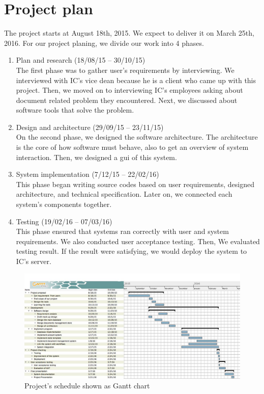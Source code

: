 \section{Project plan}
The project starts at August 18th, 2015.
We expect to deliver it on March 25th, 2016.
For our project planing, we divide our work into 4 phases.
\begin{enumerate}
\item Plan and research (18/08/15 -- 30/10/15) \hfill \\
The first phase was to gather user's requirements by interviewing.
We interviewed with IC's vice dean because he is a client who came up with this project.
Then, we moved on to interviewing IC's employees asking about document related problem they encountered.
Next, we discussed about software tools that solve the problem.
\item Design and architecture (29/09/15 -- 23/11/15) \hfill \\
On the second phase, we designed the software architecture.
The architecture is the core of how software must behave, also to get an overview of system interaction.
Then, we designed a \gls{gui} of this system.
\item System implementation (7/12/15 -- 22/02/16) \hfill \\
This phase began writing source codes based on user requirements, designed architecture, and technical specification.
Later on, we connected each system's components together.
\item Testing (19/02/16 -- 07/03/16) \hfill \\
This phase ensured that systems ran correctly with user and system requirements.
We also conducted user acceptance testing.
Then, We evaluated testing result.
If the result were satisfying, we would deploy the system to IC's server.
\end{enumerate}

\begin{landscape}
\begin{figure}
\centering
\caption{Project's schedule shown as Gantt chart}
\label{fig:project-schedule}
\includegraphics[scale=0.4]{res/project_plan}
\end{figure}
\end{landscape}